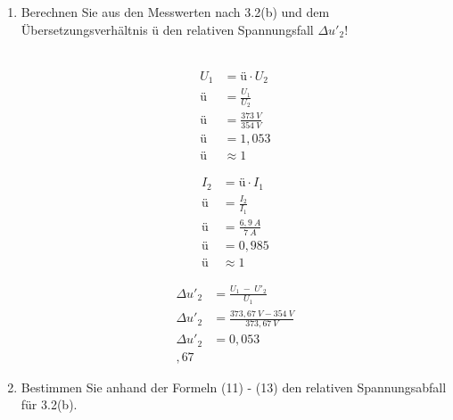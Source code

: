 \begin{enumerate}[label=\alph*)]
	\item Berechnen Sie aus den Messwerten nach 3.2(b) und dem Übersetzungsverhältnis ü
	      den relativen Spannungsfall $\Delta u'_2$!\\ \ \\

	      \begin{minipage}[r]{0.5\linewidth}
		      \begin{align*}
			      U_1 & = ü\cdot U_2            \\
			      ü   & = \frac{U_1}{U_2}       \\
			      ü   & = \frac{373\ V}{354\ V} \\
			      ü   & = 1,053                 \\
			      ü   & \approx 1
		      \end{align*}
	      \end{minipage}
	      \begin{minipage}[l]{0.5\linewidth}
		      \begin{align*}
			      I_2 & = ü\cdot I_1          \\
			      ü   & = \frac{I_2}{I_1}     \\
			      ü   & = \frac{6,9\ A}{7\ A} \\
			      ü   & = 0,985               \\
			      ü   & \approx 1
		      \end{align*}
	      \end{minipage}
	      \begin{align*}
		      \Delta u'_2 & = \frac{U_1\ -\ U'_2}{U_1}          \\
		      \Delta u'_2 & = \frac{373,67\ V - 354\ V}{373,67\ V} \\
		      \Delta u'_2 & = 0,053                             \\,67
	      \end{align*}
	\item Bestimmen Sie anhand der Formeln (11) - (13) den relativen Spannungsabfall für
	      3.2(b).


\end{enumerate}
